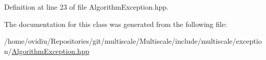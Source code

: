 Definition at line 23 of file Algorithm\-Exception.\-hpp.



The documentation for this class was generated from the following file\-:\begin{DoxyCompactItemize}
\item 
/home/ovidiu/\-Repositories/git/multiscale/\-Multiscale/include/multiscale/exception/\hyperlink{AlgorithmException_8hpp}{Algorithm\-Exception.\-hpp}\end{DoxyCompactItemize}

